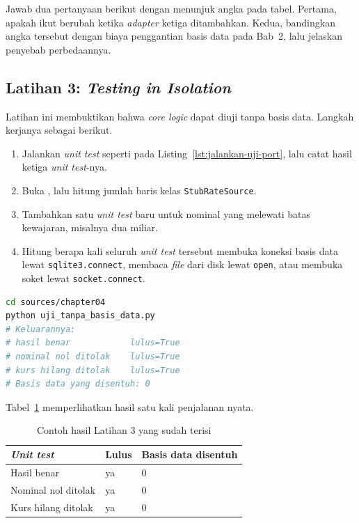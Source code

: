 Jawab dua pertanyaan berikut dengan menunjuk angka pada tabel. Pertama, apakah
 ikut berubah ketika \textit{adapter} ketiga ditambahkan.
Kedua, bandingkan angka tersebut dengan biaya penggantian basis data pada
Bab~2, lalu jelaskan penyebab perbedaannya.

\subsection*{Latihan 3: \textit{Testing in Isolation}}

Latihan ini membuktikan bahwa \textit{core logic} dapat diuji tanpa basis data.
Langkah kerjanya sebagai berikut.

\begin{enumerate}
  \item Jalankan \textit{unit test} seperti pada
    Listing~\ref{lst:jalankan-uji-port}, lalu catat hasil ketiga \textit{unit
    test}-nya.
  \item Buka , lalu hitung
    jumlah baris kelas \texttt{StubRateSource}.
  \item Tambahkan satu \textit{unit test} baru untuk nominal yang melewati
    batas kewajaran, misalnya dua miliar.
  \item Hitung berapa kali seluruh \textit{unit test} tersebut membuka koneksi
    basis data lewat \texttt{sqlite3.connect}, membaca \textit{file} dari disk
    lewat \texttt{open}, atau membuka soket lewat \texttt{socket.connect}.
\end{enumerate}

\begin{lstlisting}[language=bash, caption={Menjalankan \textit{unit test} tanpa basis
  data, skrip tersedia di \berkas{sources/chapter04/uji_tanpa_basis_data.py}},
  label=lst:jalankan-uji-port]
cd sources/chapter04
python uji_tanpa_basis_data.py
# Keluarannya:
# hasil benar            lulus=True
# nominal nol ditolak    lulus=True
# kurs hilang ditolak    lulus=True
# Basis data yang disentuh: 0
\end{lstlisting}

Tabel~\ref{tab:lat3port-contoh} memperlihatkan hasil satu kali penjalanan
nyata.

\begin{table}[htbp]
  \centering
  \caption{Contoh hasil Latihan 3 yang sudah terisi}
  \label{tab:lat3port-contoh}
  \begin{tabularx}{\textwidth}{|X|l|l|}
    \hline
    \textbf{\textit{Unit test}} & \textbf{Lulus} & \textbf{Basis data disentuh} \\
    \hline
    Hasil benar & ya & 0 \\
    \hline
    Nominal nol ditolak & ya & 0 \\
    \hline
    Kurs hilang ditolak & ya & 0 \\
    \hline
  \end{tabularx}
\end{table}

